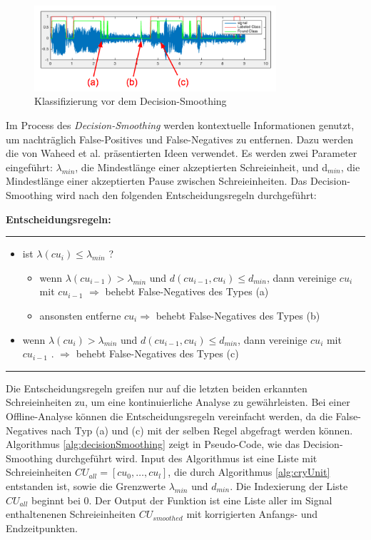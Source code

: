 \begin{figure}[h]
	\centering
	\includegraphics[width=0.8\textwidth]{bilder/smoothing02.png}
	\caption[Klassifizierung vor dem Decision-Smoothing]{Klassifizierung vor dem Decision-Smoothing}
	\label{img:beforeSmoothing}
\end{figure}

Im Process des \emph{Decision-Smoothing} werden kontextuelle Informationen genutzt, um nachträglich False-Positives und False-Negatives zu entfernen. Dazu werden die von Waheed et al. \cite{vad_entropy} präsentierten Ideen verwendet. Es werden zwei Parameter eingeführt: $\lambda_{min}$, die Mindestlänge einer akzeptierten Schreieinheit, und d$_{min}$, die Mindestlänge einer akzeptierten Pause zwischen Schreieinheiten. Das Decision-Smoothing wird nach den folgenden Entscheidungsregeln durchgeführt:

\textbf{Entscheidungsregeln: }\noindent\rule{0.7\linewidth}{0.3pt}
\begin{itemize}
	\item ist $\lambda (cu_{i}) \leq \lambda_{min}$ ?
	\begin{itemize}
		\item wenn $\lambda (cu_{i-1}) > \lambda_{min}$ und $d (cu_{i-1}, cu_{i}) \leq d_{min}$, dann vereinige $cu_{i}$ mit $cu_{i-1}$ $\Longrightarrow$ behebt False-Negatives des Types (a)
		\item ansonsten entferne $cu_i \Longrightarrow$ behebt False-Negatives des Types (b)
	\end{itemize}
	\item wenn $\lambda (cu_{i}) > \lambda_{min}$ und $d (cu_{i-1}, cu_{i}) \leq d_{min}$, dann vereinige $cu_{i}$ mit $cu_{i-1}$ . $\Longrightarrow$ behebt False-Negatives des Types (c)
\end{itemize}
\noindent\rule{\linewidth}{0.3pt}

Die Entscheidungsregeln greifen nur auf die letzten beiden erkannten Schreieinheiten zu, um eine kontinuierliche Analyse zu gewährleisten. Bei einer Offline-Analyse können die Entscheidungsregeln vereinfacht werden, da die False-Negatives nach Typ (a) und (c) mit der selben Regel abgefragt werden können. Algorithmus \autoref{alg:decisionSmoothing} zeigt in Pseudo-Code, wie das Decision-Smoothing durchgeführt wird. Input des Algorithmus ist eine Liste mit Schreieinheiten $CU_{all} = [cu_0 , \ldots , cu_l]$, die durch Algorithmus \ref{alg:cryUnit} entstanden ist, sowie die Grenzwerte $\lambda_{min}$ und $d_{min}$. Die Indexierung der Liste $CU_{all}$ beginnt bei 0. Der Output der Funktion ist eine Liste aller im Signal enthaltenenen Schreieinheiten $CU_{smoothed}$ mit korrigierten Anfangs- und Endzeitpunkten.
 
